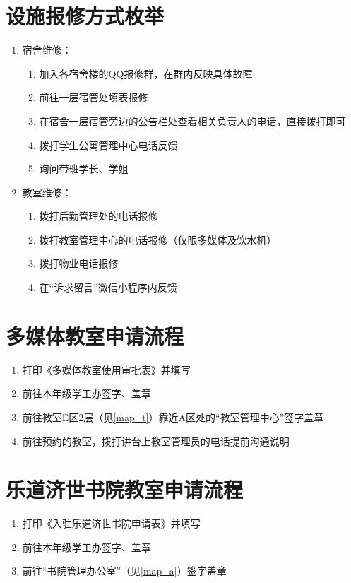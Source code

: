 \section[设施报修方式枚举]{设施报修方式枚举}
\label{repair_report}
\begin{enumerate}
      \item 宿舍维修：
            \begin{enumerate}
                  \item 加入各宿舍楼的QQ报修群，在群内反映具体故障
                  \item 前往一层宿管处填表报修
                  \item 在宿舍一层宿管旁边的公告栏处查看相关负责人的电话，直接拨打即可
                  \item 拨打学生公寓管理中心电话反馈
                  \item 询问带班学长、学姐
            \end{enumerate}
      \item 教室维修：
            \begin{enumerate}
                  \item 拨打后勤管理处的电话报修
                  \item 拨打教室管理中心的电话报修（仅限多媒体及饮水机）
                  \item 拨打物业电话报修
                  \item 在“诉求留言”微信小程序内反馈
            \end{enumerate}
\end{enumerate}

\section[多媒体教室申请流程]{多媒体教室申请流程}
\begin{enumerate}
      \item 打印《多媒体教室使用审批表》并填写
      \item 前往本年级学工办签字、盖章
      \item 前往教室E区2层（见\uline{\ref{map_t}}）靠近A区处的“教室管理中心”签字盖章
      \item 前往预约的教室，拨打讲台上教室管理员的电话提前沟通说明
\end{enumerate}

\section[乐道济世书院教室申请流程]{乐道济世书院教室申请流程}
\begin{enumerate}
      \item 打印《入驻乐道济世书院申请表》并填写
      \item 前往本年级学工办签字、盖章
      \item 前往“书院管理办公室”（见\uline{\ref{map_a}}）签字盖章
\end{enumerate}

